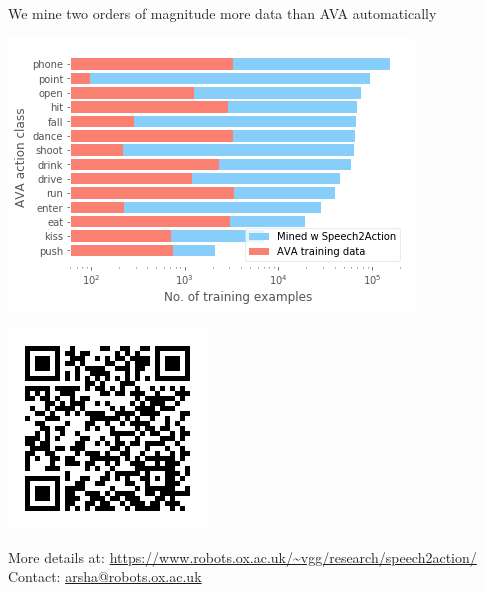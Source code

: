 \documentclass[landscape,a0paper,fontscale=0.292]{baposter}
\begin{document}
\begin{poster}
{\begin{minipage}{0.7\linewidth}
\end{minipage}
\begin{minipage}{0.3\linewidth}
\begin{center}
\begin{tiny}We mine two orders of magnitude more data than AVA automatically
\end{tiny}
\vspace{-2em}
\includegraphics[width=0.9\linewidth]{images/training_dist.png}
\vspace{-0.8em}
        \end{center}
\end{minipage}

\vspace{1.8em}
\begin{minipage}{0.1\linewidth}
\includegraphics[width=0.9\linewidth]{images/QR_code.png}
\end{minipage}
\begin{minipage}{0.8\linewidth}
More details at:  \small{\url{https://www.robots.ox.ac.uk/~vgg/research/speech2action/}} \\ 
Contact: \url{arsha@robots.ox.ac.uk}
\end{minipage}

}

\end{poster}
\end{document}
